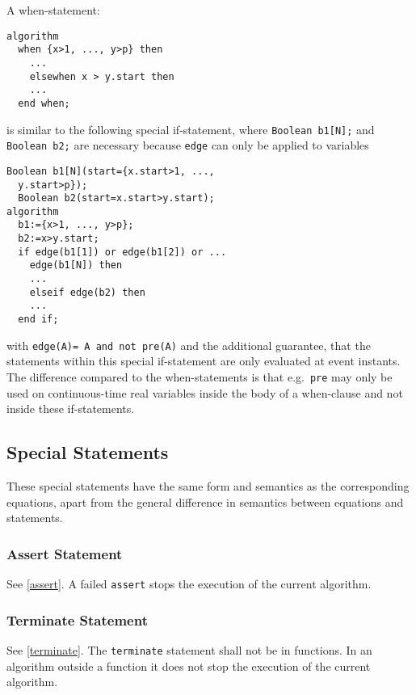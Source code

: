 A when-statement:
\begin{lstlisting}[language=modelica]
algorithm
  when {x>1, ..., y>p} then
    ...
    elsewhen x > y.start then
    ...
  end when;
\end{lstlisting}
is similar to the following special if-statement, where \lstinline!Boolean b1[N];! and \lstinline!Boolean b2;! are necessary because \lstinline!edge! can
only be applied to variables
\begin{lstlisting}[language=modelica]
  Boolean b1[N](start={x.start>1, ...,
  y.start>p});
  Boolean b2(start=x.start>y.start);
algorithm
  b1:={x>1, ..., y>p};
  b2:=x>y.start;
  if edge(b1[1]) or edge(b1[2]) or ...
    edge(b1[N]) then
    ...
    elseif edge(b2) then
    ...
  end if;
\end{lstlisting}
with \lstinline!edge(A)= A and not pre(A)! and the additional guarantee, that the
statements within this special if-statement are only evaluated at event
instants. The difference compared to the when-statements is that e.g.\ \lstinline!pre! may only be used on continuous-time real variables inside the body
of a when-clause and not inside these if-statements.

\subsection{Special Statements}\label{special-statements}

These special statements have the same form and semantics as the
corresponding equations, apart from the general difference in semantics
between equations and statements.

\subsubsection{Assert Statement}\label{assert-statement}

See \cref{assert}.  A failed \lstinline!assert! stops the execution of the current algorithm.

\subsubsection{Terminate Statement}\label{terminate-statement}

See \cref{terminate}.  The \lstinline!terminate! statement shall not be in functions.  In an algorithm outside a function it does not stop the execution of the current algorithm.
